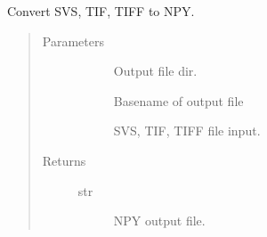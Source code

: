 \documentclass[letterpaper,10pt,english]{sphinxmanual}
\begin{document}

\begin{fulllineitems}
\label{\detokenize{index:pathflowai.utils.img2npy_}}
Convert SVS, TIF, TIFF to NPY.
\begin{quote}\begin{description}
\item[{Parameters}] \leavevmode\begin{description}
\item[{}] \leavevmode
Output file dir.

\item[{}] \leavevmode
Basename of output file

\item[{}] \leavevmode
SVS, TIF, TIFF file input.

\end{description}

\item[{Returns}] \leavevmode\begin{description}
\item[{str}] \leavevmode
NPY output file.

\end{description}

\end{description}\end{quote}

\end{fulllineitems}

\end{document}
